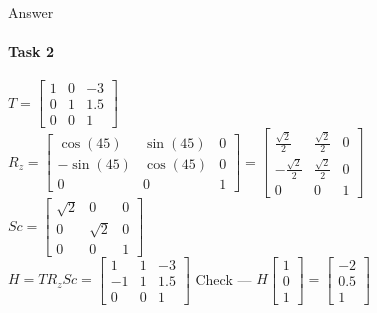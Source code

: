 \documentclass[aspectratio=169,xcolor=table,10pt, notes=hide]{beamer}
\begin{document}
\begin{frame}[c]{Answer}
\framesubtitle{Task 2}
    \vspace*{-0.2cm}
    \begin{minipage}{0.6\textwidth}
        $T = \left[\begin{matrix}1 & 0 & -3\\0 & 1 & 1.5\\0 & 0 & 1\end{matrix}\right]$\\
        $R_z = \left[\begin{matrix}\cos{\left(45 \right)} & \sin{\left(45 \right)} & 0\\- \sin{\left(45 \right)} & \cos{\left(45 \right)} & 0\\0 & 0 & 1\end{matrix}\right] =\left[\begin{matrix}\frac{\sqrt{2}}{2} & \frac{\sqrt{2}}{2} & 0\\- \frac{\sqrt{2}}{2} & \frac{\sqrt{2}}{2} & 0\\0 & 0 & 1\end{matrix}\right]$ \\
        $Sc = \left[\begin{matrix}\sqrt{2} & 0 & 0\\0 & \sqrt{2} & 0\\0 & 0 & 1\end{matrix}\right]$ \\
        $H = T R_z Sc = \left[\begin{matrix}1 & 1 & -3\\-1 & 1 & 1.5\\0 & 0 & 1\end{matrix}\right]$
        Check --- $H \begin{bmatrix} 1\\ 0\\ 1 \end{bmatrix} = \begin{bmatrix} -2\\ 0.5\\ 1 \end{bmatrix}$
    \end{minipage}
    \begin{minipage}{0.35\textwidth}
        \vspace{-0.5cm}
        \begin{figure}[H]
            \centering
\end{figure}
\end{minipage}
\end{frame}
\end{document}

